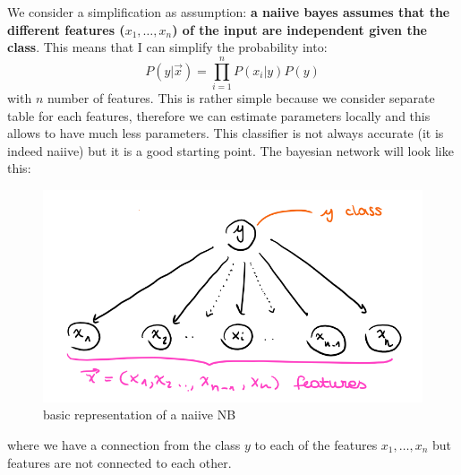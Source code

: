We consider a simplification as assumption: \textbf{a naiive bayes assumes that the different features ($x_1, \dots, x_n$) of the input are independent given the class}. This means that I can simplify the probability into: 
$$P(y|\Vec{x}) = \prod_{i=1}^n P(x_i|y)P(y)$$
with $n$ number of features. 
This is rather simple because we consider separate table for each features, therefore we can estimate parameters locally and this allows to have much less parameters. This classifier is not always accurate (it is indeed naiive) but it is a good starting point.
The bayesian network will look like this: \\
\begin{figure}[ht]
    \centering
    \includegraphics[scale=0.4]{images/naiive.png}
    \caption{basic representation of a naiive NB}
    \label{fig:naiive}
\end{figure}
where we have a connection from the class $y$ to each of the features $x_1, \dots, x_n$ but features are not connected to each other.

